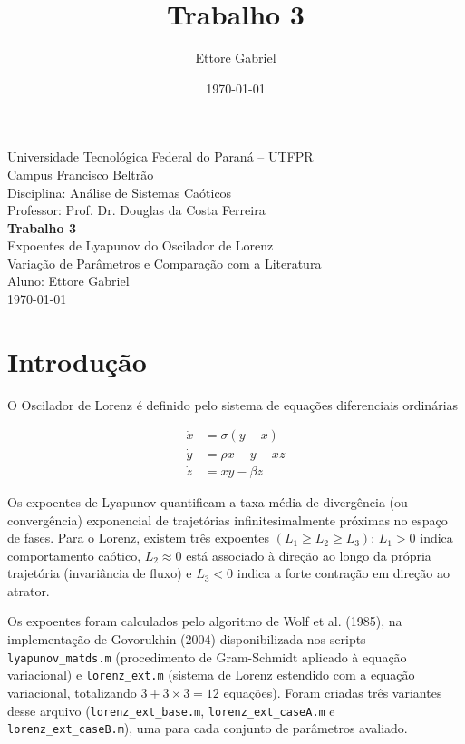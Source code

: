 \documentclass[a4paper,11pt]{article}
\title{Trabalho 3}
\author{Ettore Gabriel}
\date{\today}
\begin{document}
\begin{titlepage}
\centering
\vspace*{1cm}
{\large Universidade Tecnológica Federal do Paraná -- UTFPR}\\
{\large Campus Francisco Beltrão}\\[0.3cm]
{\large Disciplina: Análise de Sistemas Caóticos}\\
{\large Professor: Prof. Dr. Douglas da Costa Ferreira}\\[3cm]

{\Huge \textbf{Trabalho 3}}\\[0.5cm]
{\Large Expoentes de Lyapunov do Oscilador de Lorenz}\\[0.3cm]
{\large Variação de Parâmetros e Comparação com a Literatura}\\[3cm]

{\large Aluno: Ettore Gabriel}\\[0.3cm]
{\large \today}

\vfill
\end{titlepage}

\section{Introdução}

O Oscilador de Lorenz é definido pelo sistema de equações diferenciais
ordinárias

\begin{align}
\dot{x} &= \sigma(y-x) \\
\dot{y} &= \rho x - y - xz \\
\dot{z} &= xy - \beta z
\end{align}

Os expoentes de Lyapunov quantificam a taxa média de divergência (ou
convergência) exponencial de trajetórias infinitesimalmente próximas no
espaço de fases. Para o Lorenz, existem três expoentes
$(L_1 \geq L_2 \geq L_3)$: $L_1>0$ indica comportamento caótico,
$L_2\approx0$ está associado à direção ao longo da própria trajetória
(invariância de fluxo) e $L_3<0$ indica a forte contração em direção ao
atrator.

Os expoentes foram calculados pelo algoritmo de Wolf et al. (1985),
na implementação de Govorukhin (2004) disponibilizada nos scripts
\texttt{lyapunov\_matds.m} (procedimento de Gram-Schmidt aplicado à
equação variacional) e \texttt{lorenz\_ext.m} (sistema de Lorenz
estendido com a equação variacional, totalizando $3+3\times3=12$
equações). Foram criadas três variantes desse arquivo
(\texttt{lorenz\_ext\_base.m}, \texttt{lorenz\_ext\_caseA.m} e
\texttt{lorenz\_ext\_caseB.m}), uma para cada conjunto de parâmetros
avaliado.
\end{document}

